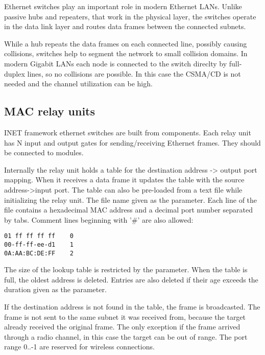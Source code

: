 Ethernet switches play an important role in modern Ethernet LANs. Unlike
passive hubs and repeaters, that work in the physical layer, the switches
operate in the data link layer and routes data frames between the connected
subnets.

While a hub repeats the data frames on each connected line, possibly causing
collisions, switches help to segment the network to small collision domains.
In modern Gigabit LANs each node is connected to the switch direclty
by full-duplex lines, so no collisions are possible. In this case the
CSMA/CD is not needed and the channel utilization can be high.

\subsection{MAC relay units}

INET framework ethernet switches are built from 
components. Each relay unit has N input and output gates for sending/receiving
Ethernet frames. They should be connected to  modules.

Internally the relay unit holds a table for the destination address -> output
port mapping. When it receives a data frame it updates the table with the
source address->input port. The table can also be pre-loaded from a text file
while initializing the relay unit. The file name given as the 
parameter. Each line of the file contains a hexadecimal MAC address and a decimal port
number separated by tabs. Comment lines beginning with '\#' are also allowed:

\begin{verbatim}
01 ff ff ff ff    0
00-ff-ff-ee-d1    1
0A:AA:BC:DE:FF    2
\end{verbatim}


The size of the lookup table is restricted by the  parameter.
When the table is full, the oldest address is deleted. Entries are also deleted
if their age exceeds the duration given as the  parameter.

If the destination address is not found in the table, the frame is broadcasted.
The frame is not sent to the same subnet it was received from, because the
target already received the original frame. The only exception if the frame
arrived through a radio channel, in this case the target can be out of range.
The port range 0..-1 are reserved for wireless connections.

